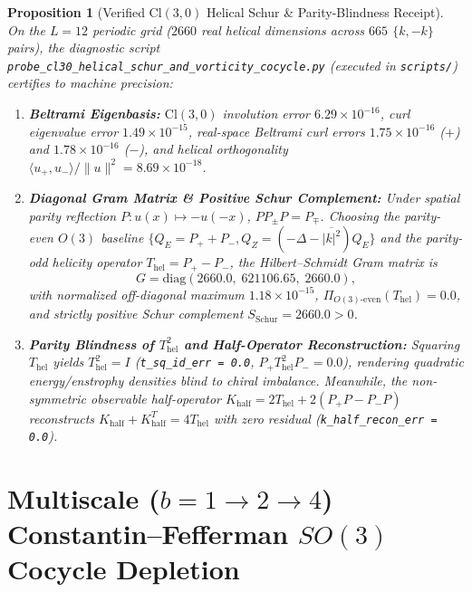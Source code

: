 \documentclass[11pt,a4paper]{article}
\newtheorem{proposition}{Proposition}
\begin{document}
\begin{proposition}[Verified $\mathrm{Cl}(3,0)$ Helical Schur \& Parity-Blindness Receipt]
On the $L=12$ periodic grid ($2660$ real helical dimensions across $665$ $\{k,-k\}$ pairs), the diagnostic script \texttt{probe\_cl30\_helical\_schur\_and\_vorticity\_cocycle.py} (executed in \texttt{scripts/}) certifies to machine precision:
\begin{enumerate}
  \item \textbf{Beltrami Eigenbasis:} $\mathrm{Cl}(3,0)$ involution error $6.29\times 10^{-16}$, curl eigenvalue error $1.49\times 10^{-15}$, real-space Beltrami curl errors $1.75\times 10^{-16}$ ($+$) and $1.78\times 10^{-16}$ ($-$), and helical orthogonality $\langle u_+, u_- \rangle / \|u\|^2 = 8.69\times 10^{-18}$.
  \item \textbf{Diagonal Gram Matrix \& Positive Schur Complement:} Under spatial parity reflection $P: u(x) \mapsto -u(-x)$, $P P_\pm P = P_\mp$. Choosing the parity-even $O(3)$ baseline $\{Q_E = P_+ + P_-, Q_Z = (-\Delta - \overline{|k|^2})Q_E\}$ and the parity-odd helicity operator $T_{\mathrm{hel}} = P_+ - P_-$, the Hilbert--Schmidt Gram matrix is
  \begin{equation}
    G = \mathrm{diag}(2660.0,\; 621106.65,\; 2660.0),
  \end{equation}
  with normalized off-diagonal maximum $1.18\times 10^{-15}$, $\Pi_{O(3)\text{-even}}(T_{\mathrm{hel}}) = 0.0$, and strictly positive Schur complement $S_{\mathrm{Schur}} = 2660.0 > 0$.
  \item \textbf{Parity Blindness of $T_{\mathrm{hel}}^2$ and Half-Operator Reconstruction:} Squaring $T_{\mathrm{hel}}$ yields $T_{\mathrm{hel}}^2 = I$ (\texttt{t\_sq\_id\_err = 0.0}, $P_+ T_{\mathrm{hel}}^2 P_- = 0.0$), rendering quadratic energy/enstrophy densities blind to chiral imbalance. Meanwhile, the non-symmetric observable half-operator $K_{\mathrm{half}} = 2T_{\mathrm{hel}} + 2(P_+ P - P_- P)$ reconstructs $K_{\mathrm{half}} + K_{\mathrm{half}}^T = 4T_{\mathrm{hel}}$ with zero residual (\texttt{k\_half\_recon\_err = 0.0}).
\end{enumerate}
\end{proposition}

\section{Multiscale (\texorpdfstring{$b = 1 \to 2 \to 4$}{b = 1 -> 2 -> 4}) Constantin--Fefferman \texorpdfstring{$SO(3)$}{SO(3)} Cocycle Depletion}
\end{document}
